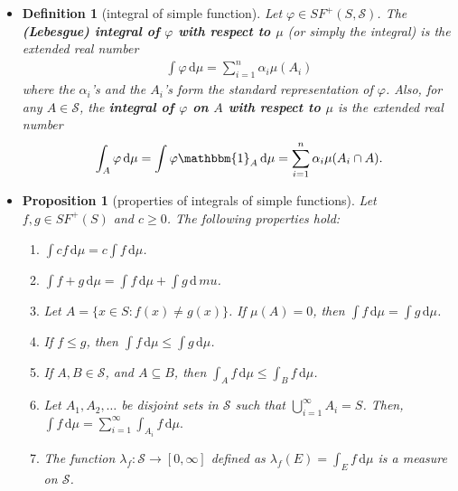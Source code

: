 \documentclass[10pt]{article}
\newtheorem{definition}[lemma]{Definition}
\newtheorem{proposition}[lemma]{Proposition}
\numberwithin{lemma}{section}
\newcommand{\dee}{\mathrm{d}}
\newcommand{\mcal}[1]{\mathcal{#1}}
\newcommand{\one}{\mathbbm{1}}
\begin{document}
\begin{itemize}
  \item \begin{definition}[integral of simple function]
    Let $\varphi \in SF^+(S,\mcal{S})$. The {\bf (Lebesgue) integral of $\varphi$ with respect to $\mu$} (or simply the integral) is the extended real number
    \begin{align*}
      \int \varphi\, \dee\mu = \sum_{i=1}^n \alpha_i \mu(A_i)
    \end{align*}
    where the $\alpha_i$'s and the $A_i$'s form the standard representation of $\varphi$. Also, for any $A \in \mcal{S}$, the {\bf integral of $\varphi$ on $A$ with respect to $\mu$} is the extended real number
    \begin{align*}
      \int_A \varphi\, \dee\mu = \int \varphi\one_A\, \dee\mu = \sum_{i=1}^n \alpha_i \mu(A_i \cap A).
    \end{align*}
  \end{definition}

  \item \begin{proposition}[properties of integrals of simple functions] \label{thm:integral-simple-func-prop}
    Let $f,g \in SF^+(S)$ and $c \geq 0$. The following properties hold:
    \begin{enumerate}
      \item $\int cf\,\dee\mu = c \int f\,\dee\mu$.
      \item $\int f+g\, \dee\mu = \int f\, \dee\mu + \int g\, \dee\,mu$.
      \item Let $A = \{ x \in S : f(x) \neq g(x) \}$. If $\mu(A) = 0$, then $\int f\, \dee\mu = \int g\, \dee\mu$.
      \item If $f \leq g$, then $\int f\, \dee\mu \leq \int g\, \dee\mu$.
      \item If $A,B \in \mcal{S}$, and $A \subseteq B$, then $\int_A f\,\dee\mu \leq \int_B f\,\dee\mu$.
      \item Let $A_1, A_2, \dotsc$ be disjoint sets in $\mcal{S}$ such that $\bigcup_{i=1}^\infty A_i = S$. Then, $\int f\, \dee\mu = \sum_{i=1}^\infty \int_{A_i} f\, \dee\mu.$
      \item The function $\lambda_f: \mcal{S} \rightarrow [0,\infty]$ defined as $\lambda_f(E) = \int_E f\, \dee\mu$ is a measure on $\mcal{S}$.
    \end{enumerate}
  \end{proposition}

\end{itemize}
\end{document}
